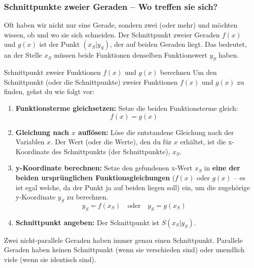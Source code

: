 \subsubsection{Schnittpunkte zweier Geraden – Wo treffen sie sich?}
\label{subsubsec:schnittpunkte_geraden}

Oft haben wir nicht nur eine Gerade, sondern zwei (oder mehr) und möchten wissen, ob und wo sie sich schneiden. Der Schnittpunkt zweier Geraden $f(x)$ und $g(x)$ ist der Punkt $(x_S|y_S)$, der auf beiden Geraden liegt. Das bedeutet, an der Stelle $x_S$ müssen beide Funktionen denselben Funktionswert $y_S$ haben.

\begin{merksatzumgebung}{Schnittpunkt zweier Funktionen $f(x)$ und $g(x)$ berechnen}
Um den Schnittpunkt (oder die Schnittpunkte) zweier Funktionen $f(x)$ und $g(x)$ zu finden, gehst du wie folgt vor:
\begin{enumerate}
    \item \textbf{Funktionsterme gleichsetzen:}
    Setze die beiden Funktionsterme gleich:
    \[ f(x) = g(x) \]
    \item \textbf{Gleichung nach $x$ auflösen:}
    Löse die entstandene Gleichung nach der Variablen $x$. Der Wert (oder die Werte), den du für $x$ erhältst, ist die x-Koordinate des Schnittpunkts (der Schnittpunkte), $x_S$.
    \item \textbf{y-Koordinate berechnen:}
    Setze den gefundenen x-Wert $x_S$ in \textbf{eine der beiden ursprünglichen Funktionsgleichungen} ($f(x)$ oder $g(x)$ – es ist egal welche, da der Punkt ja auf beiden liegen soll) ein, um die zugehörige y-Koordinate $y_S$ zu berechnen.
    \[ y_S = f(x_S) \quad \text{oder} \quad y_S = g(x_S) \]
    \item \textbf{Schnittpunkt angeben:}
    Der Schnittpunkt ist $S(x_S|y_S)$.
\end{enumerate}
Zwei nicht-parallele Geraden haben immer genau einen Schnittpunkt. Parallele Geraden haben keinen Schnittpunkt (wenn sie verschieden sind) oder unendlich viele (wenn sie identisch sind).
\end{merksatzumgebung}

